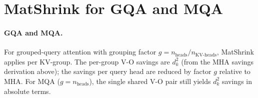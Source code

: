 \documentclass{article}
\begin{document}




\section{MatShrink for GQA and MQA} \label{sec:gqa}
\paragraph{GQA and MQA.}\label{cor:gqa}
For grouped-query attention \citep{GQA} with grouping factor $g = n_\text{heads}/n_\text{KV-heads}$, MatShrink applies per KV-group. The per-group V-O savings are $d_k^2$ (from the MHA savings derivation above); the savings per query head are reduced by factor $g$ relative to MHA. For MQA ($g = n_\text{heads}$), the single shared V-O pair still yields $d_k^2$ savings in absolute terms.

\end{document}
